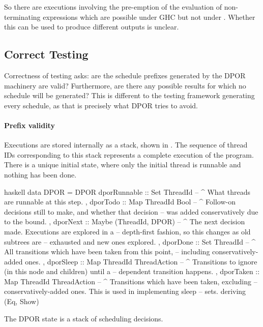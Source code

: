 So there are executions involving the pre-emption of the evaluation of
non-terminating expressions which are possible under GHC but not under
\dejafu{}.  Whether this can be used to produce different outputs is
unclear.

\subsection{Correct Testing}

Correctness of testing asks: are the schedule prefixes generated by
the DPOR machinery are valid?  Furthermore, are there any possible
results for which no schedule will be generated?  This is different to
the testing framework generating every schedule, as that is precisely
what DPOR tries to avoid.

\paragraph{Prefix validity}
Executions are stored internally as a stack, shown in .
The sequence of thread IDs corresponding to this stack represents a
complete execution of the program.  There is a unique initial state,
where only the initial thread is runnable and nothing has been done.

\begin{listing}
\centering
\begin{cminted}{haskell}
data DPOR = DPOR
  { dporRunnable :: Set ThreadId
  -- ^ What threads are runnable at this step.
  , dporTodo     :: Map ThreadId Bool
  -- ^ Follow-on decisions still to make, and whether that decision
  -- was added conservatively due to the bound.
  , dporNext     :: Maybe (ThreadId, DPOR)
  -- ^ The next decision made. Executions are explored in a
  -- depth-first fashion, so this changes as old subtrees are
  -- exhausted and new ones explored.
  , dporDone     :: Set ThreadId
  -- ^ All transitions which have been taken from this point,
  -- including conservatively-added ones.
  , dporSleep    :: Map ThreadId ThreadAction
  -- ^ Transitions to ignore (in this node and children) until a
  -- dependent transition happens.
  , dporTaken    :: Map ThreadId ThreadAction
  -- ^ Transitions which have been taken, excluding
  -- conservatively-added ones. This is used in implementing sleep
  -- sets.
  } deriving (Eq, Show)
\end{cminted}
\caption[The \dejafu{} DPOR state.]{The DPOR state is a stack of scheduling decisions.}\label{lst:dpor}
\end{listing}


